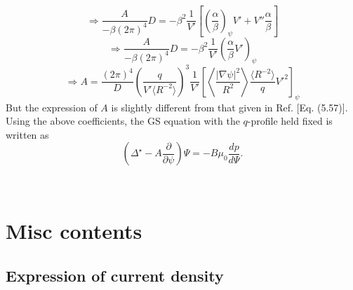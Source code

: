 \documentclass{llncs}
\begin{document}
\begin{equation}
  \Longrightarrow \frac{A}{- \beta (2 \pi)^4} D = - \beta^2 \frac{1}{V'}
  \left[ \left( \frac{\alpha}{\beta} \right)_{\psi} V' + V''
  \frac{\alpha}{\beta} \right]
\end{equation}
\begin{equation}
  \Longrightarrow \frac{A}{- \beta (2 \pi)^4} D = - \beta^2 \frac{1}{V'}
  \left( \frac{\alpha}{\beta} V' \right)_{\psi}
\end{equation}
\begin{equation}
  \Longrightarrow A = \frac{(2 \pi)^4}{D} \left( \frac{q}{V' \langle R^{- 2}
  \rangle} \right)^3 \frac{1}{V'} \left[ \left\langle \frac{| \nabla \psi
  |^2}{R^2} \right\rangle \frac{\langle R^{- 2} \rangle}{q} {V'}^2
  \right]_{\psi}
\end{equation}
But the expression of $A$ is slightly different from that given in Ref.
{\cite{jardin2010}} [Eq. (5.57)]. Using the above coefficients, the GS
equation with the $q$-profile held fixed is written as
\begin{equation}
  \left( \Delta^{\star} - A \frac{\partial}{\partial \psi} \right) \Psi = - B
  \mu_0 \frac{d p}{d \Psi} .
\end{equation}


\

\section{Misc contents}

\subsection{Expression of current density}
\end{document}
